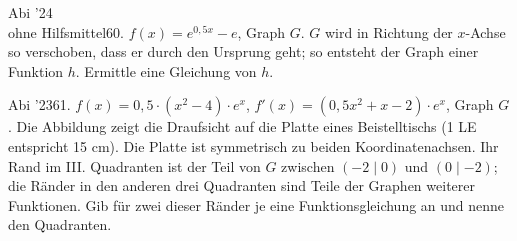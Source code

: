 \documentclass[11pt]{article}
\begin{document}
\pfgruppe{}
\begin{pfaufg}{Abi ’24\\ohne Hilfsmittel}{60.}{}
$f(x) = e^{0{,}5x} - e$, Graph $G$. $G$ wird in Richtung der $x$-Achse so verschoben, dass er durch den Ursprung geht; so entsteht der Graph einer Funktion $h$. Ermittle eine Gleichung von $h$.
\end{pfaufg}
\begin{pfaufg}{Abi ’23}{61.}{}
$f(x) = 0{,}5\cdot(x^2 - 4)\cdot e^x$, $f'(x) = (0{,}5x^2 + x - 2)\cdot e^x$, Graph $G$. Die Abbildung zeigt die Draufsicht auf die Platte eines Beistelltischs (1 LE entspricht 15 cm). Die Platte ist symmetrisch zu beiden Koordinatenachsen. Ihr Rand im III. Quadranten ist der Teil von $G$ zwischen $(-2 \mid 0)$ und $(0 \mid -2)$; die Ränder in den anderen drei Quadranten sind Teile der Graphen weiterer Funktionen. Gib für zwei dieser Ränder je eine Funktionsgleichung an und nenne den Quadranten.
\par\smallskip\noindent {}\par
{}
\end{pfaufg}
\pfgruppe{}
\end{document}
